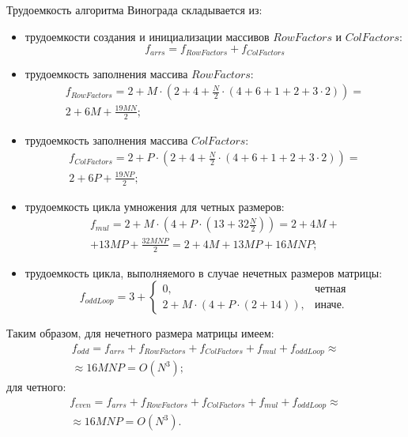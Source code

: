Трудоемкость алгоритма Винограда складывается из:
\begin{itemize}
    \item трудоемкости создания и инициализации массивов $RowFactors$ и $ColFactors$:
    \begin{equation}
        \label{eqn:f-arrs}
        f_{arrs} = f_{RowFactors} + f_{ColFactors}
    \end{equation}
    \item трудоемкость заполнения массива $RowFactors$:
    \begin{equation}
        \begin{gathered}
            f_{RowFactors} = 2 + M \cdot (2 + 4 + \frac{N}{2} \cdot (4 + 6 + 1 + 2 + 3 \cdot 2)) = \\
            2 + 6M + \frac{19MN}{2};
        \end{gathered}
    \end{equation}
    \item трудоемкость заполнения массива $ColFactors$:
    \begin{equation}
        \begin{gathered}
            f_{ColFactors} = 2 + P \cdot (2 + 4 + \frac{N}{2} \cdot (4 + 6 + 1 + 2 + 3 \cdot 2)) = \\
            2 + 6P + \frac{19NP}{2};
        \end{gathered}
    \end{equation}
    \item трудоемкость цикла умножения для четных размеров:
    \begin{equation}
        \begin{gathered}
            f_{mul} = 2 + M \cdot (4 + P \cdot (13 + 32\frac{N}{2})) = 2 + 4M + \\
            + 13MP + \frac{32MNP}{2} = 2 + 4M + 13MP + 16MNP;
        \end{gathered}
    \end{equation}
    \item трудоемкость цикла, выполняемого в случае нечетных размеров матрицы:
    \begin{equation}
        f_{oddLoop} = 3 + 
        \begin{cases}
            0, & \text{четная} \\
            2 + M \cdot (4 + P \cdot (2 + 14)), & \text{иначе.}
        \end{cases}
    \end{equation}
\end{itemize}
Таким образом, для нечетного размера матрицы имеем:
\begin{multline}
    f_{odd} = f_{arrs} + f_{RowFactors} + f_{ColFactors} + f_{mul} + f_{oddLoop} \approx \\ \approx 16MNP = O(N^3);
\end{multline}
для четного:
\begin{multline}
    f_{even} = f_{arrs} + f_{RowFactors} + f_{ColFactors} + f_{mul} + f_{oddLoop} \approx \\ \approx 16MNP = O(N^3).
\end{multline}

